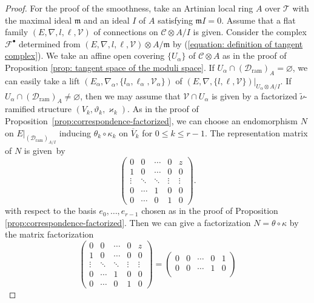 \documentclass[pdftex]{sigma}
\numberwithin{equation}{section}
\begin{document}
\begin{proof}
For the proof of the smoothness, take an Artinian local ring
$A$ over ${\mathcal T}$ with the maximal ideal $\mathfrak{m}$
and an ideal $I$ of $A$ satisfying $\mathfrak{m}I=0$.
Assume that a flat family
$(E,\nabla,l,\ell,{\mathcal V})$ of connections
on ${\mathcal C}\otimes A/I$ is given.
Consider the complex
${\mathcal F}^{\bullet}$ determined from
$(E,\nabla,l,\ell,{\mathcal V})\otimes A/\mathfrak{m}$
by (\ref{equation: definition of tangent complex}).
We take an affine open covering
$\{U_{\alpha}\}$ of ${\mathcal C}\otimes A$
as in the proof of Proposition \ref{prop: tangent space of the moduli space}.
If $U_{\alpha}\cap ({\mathcal D}_{\mathrm{ram}})_A=\varnothing$,
we can easily take a lift
$(E_{\alpha},\nabla_{\alpha},\{l_{\alpha},\ell_{\alpha},{\mathcal V}_{\alpha}\})$
of $(E,\nabla,\{l,\ell,{\mathcal V}\})|_{U_{\alpha}\otimes A/I}$.
If $U_{\alpha}\cap ({\mathcal D}_{\mathrm{ram}})_A\neq\varnothing$,
then we may assume that
${\mathcal V}\cap U_{\alpha}$ is given by a factorized $\tilde{\nu}$-ramified structure
$(V_k,\vartheta_k,\varkappa_k)$.
As in the proof of Proposition~\ref{prop:correspondence-factorized},
we can choose an endomorphism
$N$ on $E|_{({\mathcal D}_{\mathrm{ram}})_{A/I}}$
inducing $\theta_k\circ\kappa_k$ on $\overline{V}_k$
for $0\leq k\leq r-1$.
The representation matrix of $N$ is given~by
\[
 \begin{pmatrix}
 0 & 0 & \cdots & 0 & z \\
 1 & 0 & \cdots & 0 & 0 \\
 \vdots & \ddots & \ddots & \vdots & \vdots \\
 0 & \cdots & 1 & 0 & 0 \\
 0 & \cdots & 0 & 1 & 0
 \end{pmatrix}.
\]
with respect to the basis $e_0,\dots,e_{r-1}$
chosen as in the proof of Proposition \ref{prop:correspondence-factorized}.
Then we can give a factorization
$N=\theta\circ\kappa$
by the matrix factorization
\[
\begin{pmatrix}
 0 & 0 & \cdots & 0 & z \\
 1 & 0 & \cdots & 0 & 0 \\
 \vdots & \ddots & \ddots & \vdots & \vdots \\
 0 & \cdots & 1 & 0 & 0 \\
 0 & \cdots & 0 & 1 & 0
 \end{pmatrix}
 =
 \begin{pmatrix}
 0 & 0 & \cdots & 0 & 1 \\
 0 & 0 & \cdots & 1 & 0 \\

\end{pmatrix}\]
\end{proof}
\end{document}
